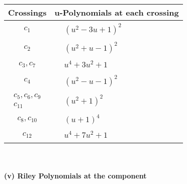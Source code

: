 \documentclass[1p]{elsarticle_modified}
\theoremstyle{definition}
\begin{document}
\begin{tabular}{m{50pt}|m{274pt}}
Crossings & \hspace{64pt}u-Polynomials at each crossing \\
\hline $$\begin{aligned}c_{1}\end{aligned}$$&$\begin{aligned}
&(u^2-3 u+1)^2
\end{aligned}$\\
\hline $$\begin{aligned}c_{2}\end{aligned}$$&$\begin{aligned}
&(u^2+u-1)^2
\end{aligned}$\\
\hline $$\begin{aligned}c_{3},c_{7}\end{aligned}$$&$\begin{aligned}
&u^4+3 u^2+1
\end{aligned}$\\
\hline $$\begin{aligned}c_{4}\end{aligned}$$&$\begin{aligned}
&(u^2- u-1)^2
\end{aligned}$\\
\hline $$\begin{aligned}c_{5},c_{6},c_{9}\\c_{11}\end{aligned}$$&$\begin{aligned}
&(u^2+1)^2
\end{aligned}$\\
\hline $$\begin{aligned}c_{8},c_{10}\end{aligned}$$&$\begin{aligned}
&(u+1)^4
\end{aligned}$\\
\hline $$\begin{aligned}c_{12}\end{aligned}$$&$\begin{aligned}
&u^4+7 u^2+1
\end{aligned}$\\
\hline
\end{tabular}\\~\\
\newpage\renewcommand{\arraystretch}{1}
\flushleft \textbf{(v) Riley Polynomials at the component}\newline \\
\end{document}
